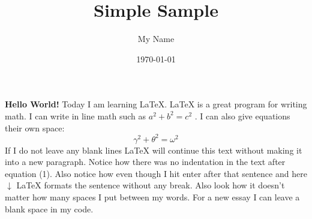 \documentclass{article} %
\title{Simple Sample} %
\author{My Name} %
\date{\today} %
\begin{document}
\maketitle %





%
\textbf{Hello World!} Today I am learning \LaTeX. %
\LaTeX{} is a great program for writing math. I can write in line math such as $a^2+b^2=c^2$ %
. I can also give equations their own space:
\begin{equation} %
  \gamma^2+\theta^2=\omega^2
\end{equation}
If I do not leave any blank lines \LaTeX{} will continue  this text without making it into a new paragraph.  Notice how there was no indentation in the text after equation (1).
Also notice how even though I hit enter after that sentence and here $\downarrow$
\LaTeX{} formats the sentence without any break.  Also   look  how      it   doesn't     matter          how    many  spaces     I put     between       my    words.
%
For a new essay I can leave a blank space in my code.
\end{document}
